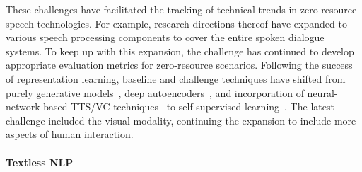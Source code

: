 These challenges have facilitated the tracking of technical trends in
zero-resource speech technologies.
For example, research directions thereof 
have expanded to various speech processing components to cover the entire
spoken dialogue systems.
To keep up with this expansion, the challenge has continued to develop
appropriate evaluation metrics for zero-resource scenarios.
Following the success of representation learning, baseline and challenge
techniques have shifted from purely generative 
models~\parencite{ondel_variational_2016,heck_feature_2017}, deep 
autoencoders~\parencite{tjandra_vqvae_2019,chorowski_unsupervised_2019}, and incorporation of
neural-network-based TTS/VC techniques~\parencite{vanniekerk_vectorquantized_2020} to
self-supervised learning~\parencite{maekaku_speech_2021}.
The latest challenge included the visual modality, continuing the
expansion to include more aspects of human interaction.

\paragraph{Textless NLP}

